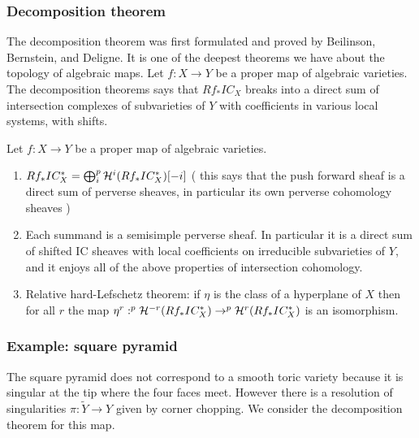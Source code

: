 \subsubsection{Decomposition theorem}
The decomposition theorem was first formulated and proved by Beilinson, Bernstein, 
and Deligne. It is one of the deepest theorems we have about the topology of algebraic maps.
Let $f:X\to Y$ be a proper map of algebraic varieties. The decomposition theorems says that 
$Rf_*IC_X$ breaks into a direct sum of intersection complexes of subvarieties of $Y$
with coefficients in various local systems, with shifts.

\begin{theorem}
     Let $f:X\to Y$ be a proper map of algebraic varieties.
    \begin{enumerate}
        \item $Rf_*IC^*_X = \bigoplus_i ^p {\mathcal{H}}^i(Rf_*IC^*_X)[-i]$ (
            this says that the push forward sheaf is a direct sum of perverse sheaves,
            in particular its own perverse cohomology sheaves
        )
        \item Each summand is a semisimple perverse sheaf. In particular it is 
        a direct sum of shifted IC sheaves with local coefficients on irreducible
        subvarieties of $Y$, and it enjoys all of the above properties of intersection
        cohomology.
        \item Relative hard-Lefschetz theorem: if $\eta$ is the class of a hyperplane of 
        $X$ then for all $r$ the map $\eta^r:^p{\mathcal{H}}^{-r}(Rf_*IC^*_X) \to ^p{\mathcal{H}}^{r}(Rf_*IC^*_X)$
        is an isomorphism.
    \end{enumerate}
\end{theorem}

\subsubsection{Example: square pyramid}
The square pyramid does not correspond to a smooth toric variety because it is singular 
at the tip where the four faces meet. However there is a resolution of singularities
$\pi:\tilde Y\to Y$ given by corner chopping. We consider the decomposition theorem for this 
map. 

\hfill 

